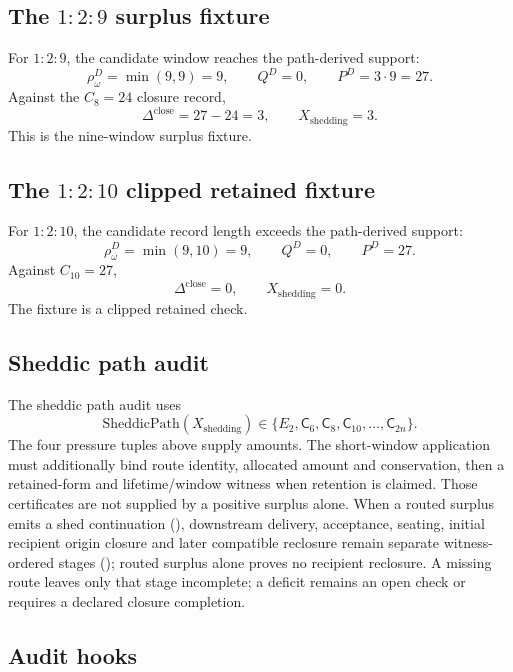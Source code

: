 \subsection{The \texorpdfstring{\(1{:}2{:}9\)}{1:2:9} surplus fixture}\label{manual:short-window:129}
For \(1{:}2{:}9\), the candidate window reaches the path-derived support:
\[
\rho^D_\omega=\min(9,9)=9,
\qquad
Q^D=0,
\qquad
P^D=3\cdot9=27.
\]
Against the \(C_8=24\) closure record,
\[
\Delta^{\mathrm{close}}=27-24=3,
\qquad
X_{\mathrm{shedding}}=3.
\]
This is the nine-window surplus fixture.

\subsection{The \texorpdfstring{\(1{:}2{:}10\)}{1:2:10} clipped retained fixture}\label{manual:short-window:1210}
For \(1{:}2{:}10\), the candidate record length exceeds the path-derived support:
\[
\rho^D_\omega=\min(9,10)=9,
\qquad
Q^D=0,
\qquad
P^D=27.
\]
Against \(C_{10}=27\),
\[
\Delta^{\mathrm{close}}=0,
\qquad
X_{\mathrm{shedding}}=0.
\]
The fixture is a clipped retained check.

\subsection{Sheddic path audit}\label{manual:short-window:shedpath-audit}
The sheddic path audit uses
\[
\mathrm{SheddicPath}(X_{\mathrm{shedding}})
\in
\{E_2,\mathsf C_6,\mathsf C_8,\mathsf C_{10},\ldots,\mathsf C_{2n}\}.
\]
The four pressure tuples above supply amounts. The short-window application
must additionally bind route identity, allocated amount and conservation,
then a retained-form and lifetime/window witness when retention is claimed.
Those certificates are not supplied by a positive surplus alone. When a routed
surplus emits a shed continuation (),
downstream delivery, acceptance, seating, initial recipient origin closure and
later compatible reclosure remain separate witness-ordered stages
(); routed surplus alone proves
no recipient reclosure. A missing route leaves only that stage incomplete; a
deficit remains an open check or requires a declared closure completion.

\subsection{Audit hooks}\label{manual:short-window:audit-hooks}
